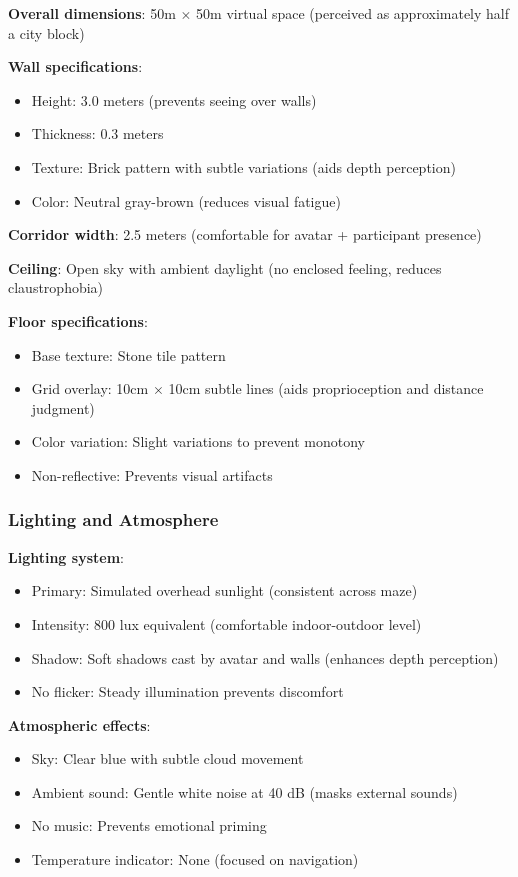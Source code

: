 \documentclass[12pt]{article}
\begin{document}
\textbf{Overall dimensions}: 50m $\times$ 50m virtual space (perceived as approximately half a city block)

\textbf{Wall specifications}:
\begin{itemize}
    \item Height: 3.0 meters (prevents seeing over walls)
    \item Thickness: 0.3 meters
    \item Texture: Brick pattern with subtle variations (aids depth perception)
    \item Color: Neutral gray-brown (reduces visual fatigue)
\end{itemize}

\textbf{Corridor width}: 2.5 meters (comfortable for avatar + participant presence)

\textbf{Ceiling}: Open sky with ambient daylight (no enclosed feeling, reduces claustrophobia)

\textbf{Floor specifications}:
\begin{itemize}
    \item Base texture: Stone tile pattern
    \item Grid overlay: 10cm $\times$ 10cm subtle lines (aids proprioception and distance judgment)
    \item Color variation: Slight variations to prevent monotony
    \item Non-reflective: Prevents visual artifacts
\end{itemize}

\subsubsection{Lighting and Atmosphere}

\textbf{Lighting system}:
\begin{itemize}
    \item Primary: Simulated overhead sunlight (consistent across maze)
    \item Intensity: 800 lux equivalent (comfortable indoor-outdoor level)
    \item Shadow: Soft shadows cast by avatar and walls (enhances depth perception)
    \item No flicker: Steady illumination prevents discomfort
\end{itemize}

\textbf{Atmospheric effects}:
\begin{itemize}
    \item Sky: Clear blue with subtle cloud movement
    \item Ambient sound: Gentle white noise at 40 dB (masks external sounds)
    \item No music: Prevents emotional priming
    \item Temperature indicator: None (focused on navigation)
\end{itemize}
\end{document}
